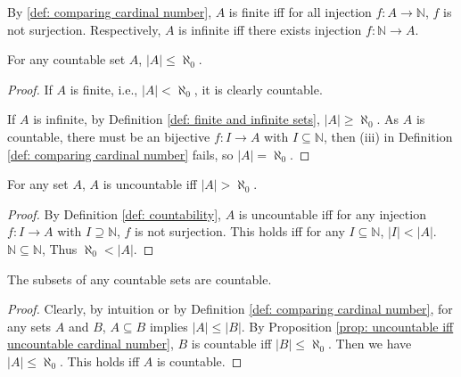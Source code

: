 By \ref{def: comparing cardinal number}, $A$ is finite iff for all injection $f: A \to \mathbb N$, $f$ is not surjection. Respectively, $A$ is infinite iff there exists injection $f: \mathbb N \to A$.


\begin{proposition}
    For any countable set $A$, $|A| \le \aleph_0$.
    
	\begin{proof}
	    If $A$ is finite, i.e., $|A| < \aleph_0$, it is clearly countable.
	    
	    If $A$ is infinite, by Definition \ref{def: finite and infinite sets}, $|A| \ge \aleph_0$. As $A$ is countable, there must be an bijective $f: I \to A$ with $I \subseteq \mathbb N$, then (iii) in Definition \ref{def: comparing cardinal number} fails, so $|A| = \aleph_0$.
	\end{proof}
\end{proposition}


\begin{proposition}
    \label{prop: uncountable iff uncountable cardinal number}
    
    For any set $A$, $A$ is uncountable iff $|A| > \aleph_0$.
    
	\begin{proof}
	    By Definition \ref{def: countability}, $A$ is uncountable iff for any injection $f: I \to A$ with $I \supseteq \mathbb N$, $f$ is not surjection. This holds iff for any $I \subseteq \mathbb N$, $|I| < |A|$. $\mathbb N \subseteq \mathbb N$, Thus $\aleph_0 < |A|$.
	\end{proof}
\end{proposition}


\begin{proposition}
	The subsets of any countable sets are countable.
	
	\begin{proof}
		Clearly, by intuition or by Definition \ref{def: comparing cardinal number}, for any sets $A$ and $B$, $A \subseteq B$ implies $|A| \le |B|$. By Proposition \ref{prop: uncountable iff uncountable cardinal number}, $B$ is countable iff $|B| \le \aleph_0$. Then we have $|A| \le \aleph_0$. This holds iff $A$ is countable.
	\end{proof}
\end{proposition}


